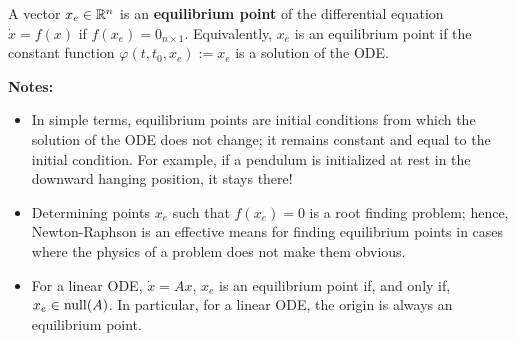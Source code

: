 \begin{tcolorbox}[colback=mylightblue, title = {\bf Equilibrium Points}, breakable]

\begin{definition} 
   \label{def:equilibriumPoint}
A vector $x_e \in \mathbb R^n$ is an \textbf{equilibrium point} of the differential equation $\dot{x} = f(x)$ if $f(x_e) = 0_{n \times 1}$. 
Equivalently, $x_e$ is an equilibrium point if the constant function $\varphi(t, t_0, x_e):=x_e$ is a solution of the ODE. \\
\end{definition}
 \vspace*{.1cm}
\textbf{Notes:} 
\begin{itemize}
    \item In simple terms, equilibrium points are initial conditions from which the solution of the ODE does not change; it remains constant and equal to the initial condition. For example, if a pendulum is initialized at rest in the downward hanging position, it stays there!
    \item Determining points $x_e$ such that $f(x_e)=0$ is a root finding problem; hence, Newton-Raphson is an effective means for finding equilibrium points in cases where the physics of a problem does not make them obvious.
    \item For a linear ODE, $\dot{x} = Ax$, $x_e$ is an equilibrium point if, and only if, $x_e \in \mathrm{null}(A)$. In particular, for a linear ODE, the origin is always an equilibrium point.
\end{itemize}
\end{tcolorbox}

 \bigskip

